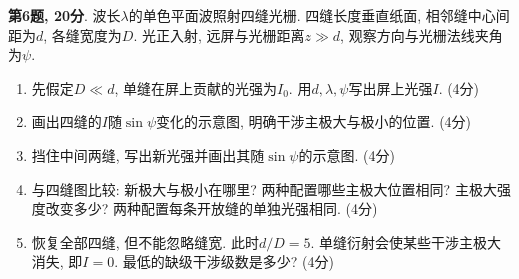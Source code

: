 \begin{exercise}
\textbf{第6题, 20分}. \label{exam:f2.6}
波长$\lambda$的单色平面波照射四缝光栅. 四缝长度垂直纸面, 相邻缝中心间距为$d$, 各缝宽度为$D$. 光正入射, 远屏与光栅距离$z\gg d$, 观察方向与光栅法线夹角为$\psi$.
\begin{enumerate}[label=(\alph*)]
\item 先假定$D\ll d$, 单缝在屏上贡献的光强为$I_0$. 用$d,\lambda,\psi$写出屏上光强$I$. (4分)
\item 画出四缝的$I$随$\sin\psi$变化的示意图, 明确干涉主极大与极小的位置. (4分)
\item 挡住中间两缝, 写出新光强并画出其随$\sin\psi$的示意图. (4分)
\item 与四缝图比较: 新极大与极小在哪里? 两种配置哪些主极大位置相同? 主极大强度改变多少? 两种配置每条开放缝的单独光强相同. (4分)
\item 恢复全部四缝, 但不能忽略缝宽. 此时$d/D=5$. 单缝衍射会使某些干涉主极大消失, 即$I=0$. 最低的缺级干涉级数是多少? (4分)
\end{enumerate}
\end{exercise}
